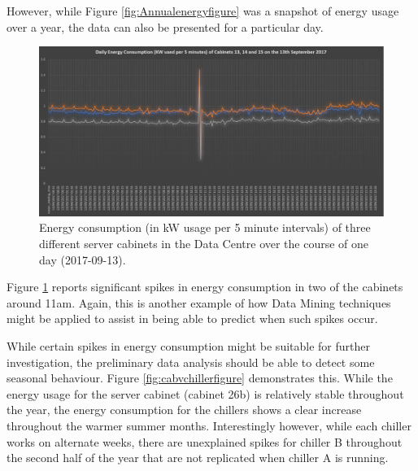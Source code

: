 \documentclass[12pt]{scrartcl}
\begin{document}
However, while Figure \ref{fig:Annualenergyfigure} was a snapshot of energy usage over a year, the data can also be presented for a particular day. 

\begin{figure}[h]
  \caption{Energy consumption (in kW usage per 5 minute intervals) of three different server cabinets in the Data Centre over the course of one day (2017-09-13).}
  \label{fig:Dailyenergyfigure}
  \centering
    \includegraphics[scale=0.35]{Daily_energy_consumption_of_cab131415.png}
\end{figure}
   
Figure \ref{fig:Dailyenergyfigure} reports significant spikes in energy consumption in two of the cabinets around 11am. Again, this is another example of how Data Mining techniques might be applied to assist in being able to predict when such spikes occur. 

While certain spikes in energy consumption might be suitable for further investigation, the preliminary data analysis should be able to detect some seasonal behaviour. Figure \ref{fig:cabvchillerfigure} demonstrates this. While the energy usage for the server cabinet (cabinet 26b) is relatively stable throughout the year, the energy consumption for the chillers shows a clear increase throughout the warmer summer months. Interestingly however, while each chiller works on alternate weeks, there are unexplained spikes for chiller B throughout the second half of the year that are not replicated when chiller A is running. 
\end{document}
